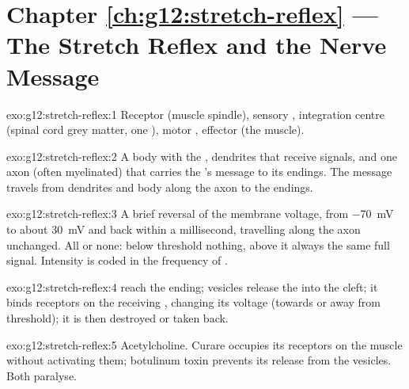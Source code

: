 \section*{Chapter \ref{ch:g12:stretch-reflex} --- The Stretch Reflex and the Nerve Message}

\begin{solution}{exo:g12:stretch-reflex:1}
Receptor (muscle spindle), sensory , integration centre (spinal
cord grey matter, one ), motor , effector (the muscle).
\end{solution}

\begin{solution}{exo:g12:stretch-reflex:2}
A  body with the , dendrites that receive signals, and one
axon (often myelinated) that carries the 's message to its
endings. The message travels from dendrites and  body along the
axon to the endings.
\end{solution}

\begin{solution}{exo:g12:stretch-reflex:3}
A brief reversal of the membrane voltage, from \qty{-70}{mV} to about
\qty{+30}{mV} and back within a millisecond, travelling along the axon
unchanged. All or none: below threshold nothing, above it always the
same full signal. Intensity is coded in the frequency of .
\end{solution}

\begin{solution}{exo:g12:stretch-reflex:4}
 reach the ending; vesicles release the
 into the cleft; it binds receptors on the receiving
, changing its voltage (towards or away from threshold); it is
then destroyed or taken back.
\end{solution}

\begin{solution}{exo:g12:stretch-reflex:5}
Acetylcholine. Curare occupies its receptors on the muscle without
activating them; botulinum toxin prevents its release from the
vesicles. Both paralyse.
\end{solution}

